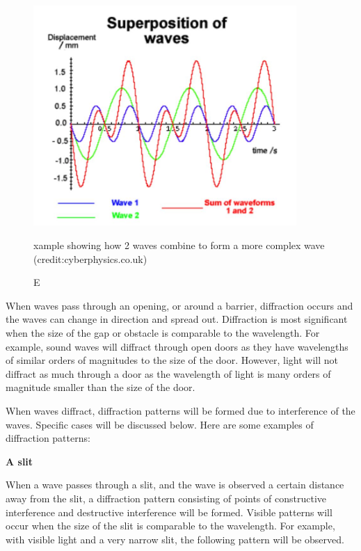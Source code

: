 \documentclass[revision-guide.tex]{subfiles}
\begin{document}
\begin{figure}[h!]
\centering
\includegraphics[width=10cm]{figs/chapt-7/sine1.JPG}
\caption Example showing how 2 waves combine to form a more complex wave (credit:cyberphysics.co.uk)
\end{figure}



When waves pass through an opening, or around a barrier, diffraction occurs and the waves can change in direction and spread out. Diffraction is most significant when the size of the gap or obstacle is comparable to the wavelength. For example, sound waves will diffract through open doors as they have wavelengths of similar orders of magnitudes to the size of the door. However, light will not diffract as much through a door as the wavelength of light is many orders of magnitude smaller than the size of the door.

When waves diffract, diffraction patterns will be formed due to interference of the waves. Specific cases will be discussed below. Here are some examples of diffraction patterns:

\textbf{A slit}

When a wave passes through a slit, and the wave is observed a certain distance away from the slit, a diffraction pattern consisting of points of constructive interference and destructive interference will be formed. Visible patterns will occur when the size of the slit is comparable to the wavelength. For example, with visible light and a very narrow slit, the following pattern will be observed.
\end{document}
